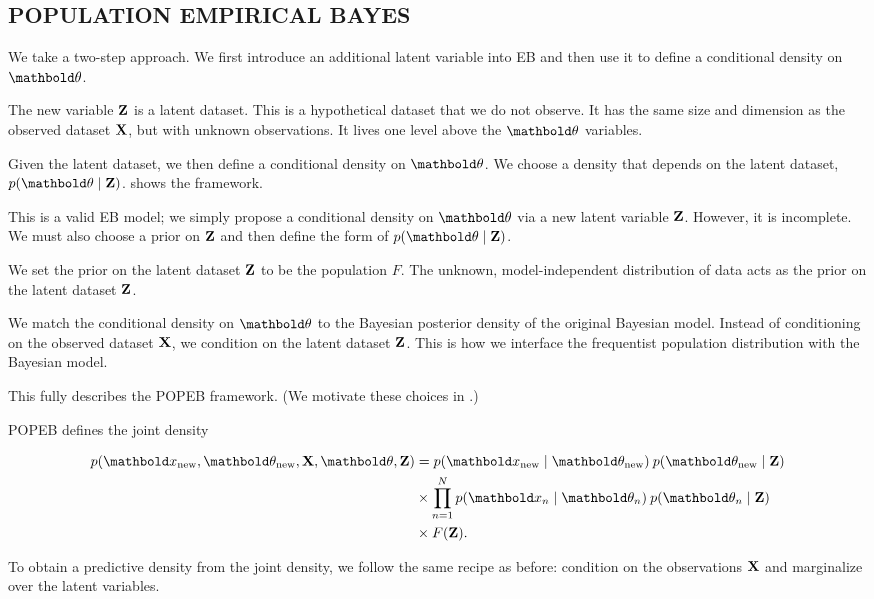 \subsection{POPULATION EMPIRICAL BAYES}

We take a two-step approach. We first introduce an additional latent variable
into \gls{EB} and then use it to define a conditional density on $\mbtheta$.

The new variable $\textbf{Z}$ is a latent dataset. This is a hypothetical dataset
that we do not observe. It has the same size and dimension as the observed
dataset $\textbf{X}$, but with unknown observations. It lives one level above the
$\mbtheta$ variables.

Given the latent dataset, we then define a conditional density on $\mbtheta$. We
choose a density that depends on the latent dataset, $p(\mbtheta\mid\mbZ)$.
 shows the framework.

This is a valid \gls{EB} model; we simply propose a conditional density on
$\mbtheta$ via a new latent variable $\textbf{Z}$. However, it is incomplete. We must
also choose a prior on $\textbf{Z}$ and then define the form of $p(\mbtheta\mid\mbZ)$.

We set the prior on the latent dataset $\textbf{Z}$ to be the
population $F$. The unknown, model-independent distribution of data acts as the
prior on the latent dataset $\textbf{Z}$.

We match the conditional density on $\mbtheta$ to the Bayesian
posterior density of the original Bayesian model. Instead of conditioning on the
observed dataset $\textbf{X}$, we condition on the latent dataset $\textbf{Z}$. This is how
we interface the frequentist population distribution with the Bayesian model.

This fully describes the \gls{POPEB} framework. (We motivate these choices in
.)

\gls{POPEB} defines the joint density
\begin{linenomath}
\begin{align}
  p(\xnew,\thetanew,\mbX,\mb\theta,\mbZ)
    &=
    p(\xnew \mid \thetanew) \: p(\thetanew \mid \mbZ)\nonumber\\
    &\times
    \prod_{n=1}^Np(\mbx_n \mid \mbtheta_n) \: p(\mbtheta_n \mid \mbZ)\nonumber\\
    &\times F(\mbZ).\label{eq:peb_joint}
\end{align}
\end{linenomath}
To obtain a predictive density from the joint density, we follow the same
recipe as before: condition on the observations $\textbf{X}$ and marginalize over the
latent variables.


